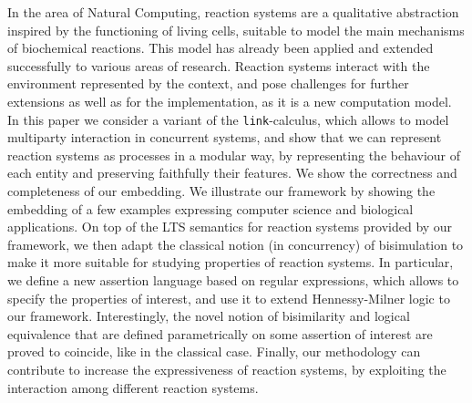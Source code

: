 
In the area of Natural Computing, reaction systems are
a qualitative abstraction inspired by the 
functioning of living cells, suitable to model the main
mechanisms of biochemical reactions.
This model has already been applied
and extended successfully to various areas of research. Reaction 
systems interact with the environment represented by the context, and
pose challenges for further extensions as well as
for the implementation, as it is a new computation model. 
In this paper we consider a variant of the {\tt link}-calculus, which allows to model 
multiparty interaction in concurrent systems, and show that we can
represent reaction systems as processes 
in a modular way, by representing the behaviour of each entity and
preserving faithfully their features. 
We show the correctness and completeness 
of our embedding.
We illustrate our framework by showing the embedding of 
a few examples expressing computer science
and biological applications. 
On top of the LTS semantics for reaction systems provided by our framework, 
we then adapt the classical notion (in concurrency) of bisimulation
to make it more suitable for studying properties of reaction systems.
In particular, we define a new assertion language based on regular expressions, 
which allows to specify the properties of interest, and use it to extend Hennessy-Milner logic
to our framework. Interestingly, the novel notion of bisimilarity and logical equivalence that are defined parametrically on some assertion of interest are proved to coincide, like in the classical case.
Finally, our methodology can contribute to increase the expressiveness
of reaction systems, by exploiting the interaction among 
different reaction systems. 
